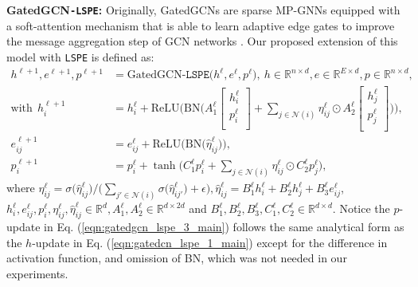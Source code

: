 \documentclass{article} \usepackage{iclr2021_conference,times}
\begin{document}
{\bf GatedGCN\texttt{-LSPE}:}
Originally, GatedGCNs are sparse MP-GNNs equipped with a soft-attention mechanism that is able to learn adaptive edge gates to improve the message aggregation step of GCN networks \citep{kipf2017semi}. Our proposed extension of this model with \texttt{LSPE} is defined as:
\begin{align}
    h^{\ell+1}, e^{\ell+1}, p^{\ell+1} &= \text{GatedGCN}\texttt{-LSPE}\Big(h^{\ell}, e^{\ell}, p^{\ell}\Big), \ h\in\mathbb{R}^{n\times d}, e\in\mathbb{R}^{E\times d}, p\in\mathbb{R}^{n\times d},\\
    \text{with} \ \ h_i^{\ell+1} &= h_i^{\ell} + \text{ReLU}\Big( \text{BN} \Big( A_1^{\ell} \left[ \!\!\begin{array}{c} h_i^\ell \\ p_i^\ell \\ \end{array} \!\!\right] + \sum_{j \in \mathcal{N}(i)} \eta_{ij}^{\ell} \odot A_2^{\ell} \left[ \!\!\begin{array}{c} h_j^\ell \\ p_j^\ell \\ \end{array} \!\!\right] \Big) \Big), \label{eqn:gatedcn_lspe_1_main}\\
e_{ij}^{\ell+1} &= e_{ij}^{\ell} + \text{ReLU}\big(\text{BN}\big(\hat{\eta}_{ij}^{\ell}\big)\big),\label{eqn:gatedgcn_lspe_2_main}\\
p_i^{\ell+1} &= p_i^{\ell} + \tanh \Big( C_1^{\ell}p_i^{\ell} + \sum_{j \in \mathcal{N}(i)} \eta_{ij}^{\ell} \odot C_2^{\ell}
  p_j^{\ell} \Big), \label{eqn:gatedgcn_lspe_3_main} \end{align}
where $\eta_{ij}^{\ell} = \sigma\big(\hat{\eta}_{ij}^{\ell}\big)/\big( \sum_{j' \in \mathcal{N}(i)} \sigma\big(\hat{\eta}_{ij'}^{\ell}\big) + \epsilon\big),  
\hat{\eta}_{ij}^{\ell} = B_1^{\ell}h_i^{\ell} + B_2^{\ell}h_j^{\ell} + B_3^{\ell}e_{ij}^{\ell}$, 
$h_i^{\ell}, e_{ij}^{\ell}, p_i^{\ell}, {\eta}_{ij}^{\ell}, \hat{\eta}_{ij}^{\ell} \in \mathbb{R}^{d}, A_1^{\ell}, A_2^{\ell} \in \mathbb{R}^{d \times 2d}$ and $B_1^{\ell}, B_2^{\ell}, B_3^{\ell}, C_1^{\ell}, C_2^{\ell} \in \mathbb{R}^{d \times d}$. Notice the $p$-update in Eq. (\ref{eqn:gatedgcn_lspe_3_main}) follows the same analytical form as the $h$-update in Eq. (\ref{eqn:gatedcn_lspe_1_main}) except for the difference in activation function, and omission of BN, which was not needed in our experiments.
\end{document}
